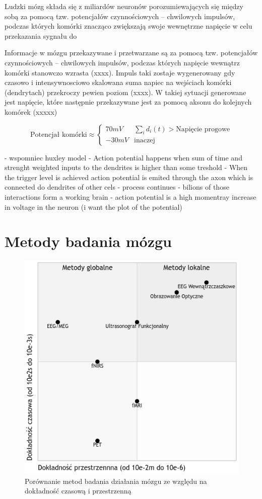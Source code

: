 \documentclass{./assets/wfis}
\begin{document}
Ludzki mózg składa się z miliardów neuronów porozumiewających się między sobą za pomocą tzw. potencjałów czynnościowych – chwilowych impulsów, podczas których komórki znacząco zwiększają swoje wewnętrzne napięcie w celu przekazania sygnału do

Informacje w mózgu przekazywane i przetwarzane są za pomocą tzw. potencjałów czynnościowych – chwilowych impulsów, podczas których napięcie wewnątrz komórki stanowczo wzrasta (xxxx). Impuls taki zostaje wygenerowany gdy czasowo i intensywnosciowo skalowana suma napiec na wejściach komórki (dendrytach) przekroczy pewien poziom (xxxx). W takiej sytuacji generowane jest napięcie, które następnie przekazywane jest za pomocą aksonu do kolejnych komórek (xxxxx)

\begin{equation}
    \text{Potencjał komórki} \approx 
    \begin{cases} 
      70mV & \sum_i d_i(t) > \text{Napięcie progowe}  \\
      -30mV &  \text{inaczej}
   \end{cases}
\end{equation}

- wspomniec huxley model
- Action potential happens when sum of time and strenght weighted inputs to the dendrites is higher than some treshold
- When the trigger level is achieved action potential is emited through the axon which is connected do dendrites of other cels - process continues
- bilions of those interactions form a working brain
- action potential is a high momentray increase in voltage in the neuron (i want the plot of the potential)

\section{Metody badania mózgu}

\begin{figure}[h]
    \centering
    \includegraphics[width=0.5\columnwidth]{thesis/assets/porownanie_metod_badania_mozgu.png}
    \caption{Porównanie metod badania działania mózgu ze względu na dokładność czasową i przestrzenną}
    \label{fig:brain-imaging-comparasion}
\end{figure}
\end{document}
